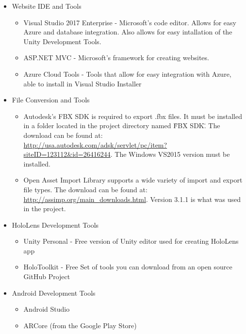 \begin{itemize}

    \item Website IDE and Tools
    \begin{itemize}
        \item Visual Studio 2017 Enterprise - Microsoft's code editor. Allows for easy Azure and database
        integration. Also allows for easy intallation of the Unity Development Tools.
        \item ASP.NET MVC - Microsoft's framework for creating websites.
        \item Azure Cloud Tools - Tools that allow for easy integration with Azure, able to install in Visual Studio Installer
    \end{itemize}

    \item File Conversion and Tools
    \begin{itemize}
        \item Autodesk's FBX SDK is required to export .fbx files.  It must be installed in a folder located in the project directory named \"FBX SDK\".  The download can be found at: 
        \url{http://usa.autodesk.com/adsk/servlet/pc/item?siteID=123112&id=26416244}.
        The Windows VS2015 version must be installed.

        \item Open Asset Import Library supports a wide variety of import and export file types.  The download can be found at: \url{http://assimp.org/main_downloads.html}.  Version 3.1.1 is what was used in the project.         
    \end{itemize}

    \item HoloLens Development Tools
    \begin{itemize}
        \item Unity Personal - Free version of Unity editor used for creating HoloLens app

        \item HoloToolkit - Free Set of tools you can download from an open source GitHub Project

    \end{itemize}

    \item Android Development Tools
    \begin{itemize}
        \item Android Studio
        \item ARCore (from the Google Play Store)
    \end{itemize}
\end{itemize}


